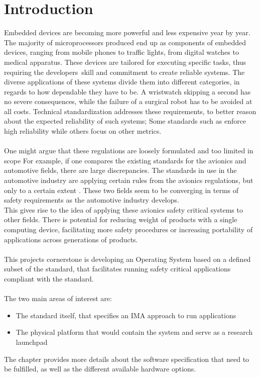\chapter{Introduction}\label{ch:introduction}

Embedded devices are becoming more powerful and less expensive year by year.
The majority of microprocessors produced end up as components of embedded devices,
ranging from mobile phones to traffic lights, from digital watches to medical apparatus.
These devices are tailored for executing specific tasks,
thus requiring the developers\textquotesingle\ skill and commitment to create reliable systems.
The diverse applications of these systems divide them into different categories,
in regards to how dependable they have to be. A wristwatch skipping a second has no severe consequences,
while the failure of a surgical robot has to be avoided at all costs.
Technical standardization addresses these requirements,
to better reason about the expected reliability of such systems;
Some standards such as \arinc{} enforce high reliability while others focus on other metrics.
\\\\
One might argue that these regulations are loosely formulated and too limited in scope
For example, if one compares the existing standards for the avionics and automotive fields,
there are large discrepancies.
The standards in use in the automotive industry are applying certain rules from the avionics regulations,
but only to a certain extent \cite {can_cars_fly}.
These two fields seem to be converging in terms of safety requirements as the automotive industry develops.
\\
This gives rise to the idea of applying these avionics safety critical systems to other fields.
There is potential for reducing weight of products with a single computing device, facilitating more safety procedures
or increasing portability of applications across generations of products.
\\\\
This project\textquotesingle s cornerstone is developing an Operating System based on a defined subset of the \arinc{} standard,
that facilitates running safety critical applications compliant with the \arinc{} standard.
\\\\
The two main areas of interest are:
\\
\begin{itemize}
\item The standard itself, that specifies an IMA approach to run applications
\item The physical platform that would contain the system and serve as a research launchpad
\end{itemize}
The  chapter provides more details about the software specification that need to be fulfilled,
as well as the different available hardware options.
